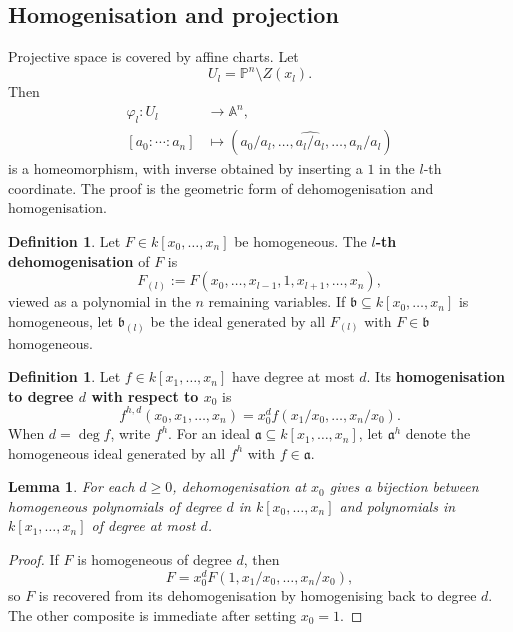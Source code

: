 \documentclass[12pt]{article}
\theoremstyle{plain}
\newtheorem{lemma}[thm]{Lemma}
\theoremstyle{definition}
\newtheorem{defn}[thm]{Definition} %
\newcommand{\bb}[1]{\mathbb{#1}}
\begin{document}
\subsection{Homogenisation and projection}\label{sec:homog_proj}
Projective space is covered by affine charts. Let
\[
U_l=\bb P^n\setminus Z(x_l).
\]
Then
\begin{align*}
\varphi_l:U_l&\longrightarrow \bb A^n,\\
[a_0:\cdots:a_n]&\longmapsto (a_0/a_l,\ldots,\widehat{a_l/a_l},\ldots,a_n/a_l)
\end{align*}
is a homeomorphism, with inverse obtained by inserting a $1$ in the $l$-th coordinate. The proof is the geometric form of dehomogenisation and homogenisation.

\begin{defn}\label{def:projection}
Let $F\in k[x_0,\ldots,x_n]$ be homogeneous. The \textbf{$l$-th dehomogenisation} of $F$ is
\[
F_{(l)}:=F(x_0,\ldots,x_{l-1},1,x_{l+1},\ldots,x_n),
\]
viewed as a polynomial in the $n$ remaining variables. If $\mathfrak b\subseteq k[x_0,\ldots,x_n]$ is homogeneous, let $\mathfrak b_{(l)}$ be the ideal generated by all $F_{(l)}$ with $F\in\mathfrak b$ homogeneous.
\end{defn}

\begin{defn}\label{def:homogenisation}
Let $f\in k[x_1,\ldots,x_n]$ have degree at most $d$. Its \textbf{homogenisation to degree $d$ with respect to $x_0$} is
\[
f^{h,d}(x_0,x_1,\ldots,x_n)=x_0^d f(x_1/x_0,\ldots,x_n/x_0).
\]
When $d=\deg f$, write $f^h$. For an ideal $\mathfrak a\subseteq k[x_1,\ldots,x_n]$, let $\mathfrak a^h$ denote the homogeneous ideal generated by all $f^h$ with $f\in\mathfrak a$.
\end{defn}

\begin{lemma}\label{lem:poly_homog_bij}
For each $d\geq0$, dehomogenisation at $x_0$ gives a bijection between homogeneous polynomials of degree $d$ in $k[x_0,\ldots,x_n]$ and polynomials in $k[x_1,\ldots,x_n]$ of degree at most $d$.
\end{lemma}
\begin{proof}
If $F$ is homogeneous of degree $d$, then
\[
F=x_0^dF(1,x_1/x_0,\ldots,x_n/x_0),
\]
so $F$ is recovered from its dehomogenisation by homogenising back to degree $d$. The other composite is immediate after setting $x_0=1$.
\end{proof}
\end{document}
